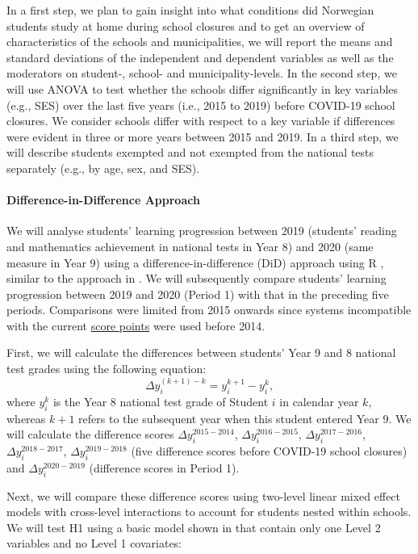 In a first step, we plan to gain insight into what conditions did Norwegian students study at home during school closures and to get an overview of characteristics of the schools and municipalities, we will report the means and standard deviations of the independent and dependent variables as well as the moderators on student-, school- and municipality-levels. In the second step, we will use ANOVA to test whether the schools differ significantly in key variables (e.g., SES) over the last five years (i.e., 2015 to 2019) before COVID-19 school closures. We consider schools differ with respect to a key variable if differences were evident in three or more years between 2015 and 2019. In a third step, we will describe students exempted and not exempted from the national tests separately (e.g., by age, sex, and SES).

\paragraph{Difference-in-Difference Approach}

We will analyse students' learning progression between 2019 (students' reading and mathematics achievement in national tests in Year 8) and 2020 (same measure in Year 9) using a difference-in-difference (DiD) approach \parencite{angrist:2009} using \textsf{R} \parencite[e.g., ][]{brumback:2021}, similar to the approach in \textcite{engzell:2021}. We will subsequently compare students' learning progression between 2019 and 2020 (Period 1) with that in the preceding five periods. Comparisons were limited from 2015 onwards since systems incompatible with the current \href{https://www.ssb.no/en/utdanning/grunnskoler/statistikk/nasjonale-prover}{score points} were used before 2014.

First, we will calculate the differences between students' Year 9 and 8 national test grades using the following equation:
    \[ \Delta y_i^{(k+1)-k} = y_i^{k+1} - y_i^k, \]
where $y_i^k$  is the Year 8 national test grade of Student $i$ in calendar year $k$, whereas $k+1$ refers to the subsequent year when this student entered Year 9. We will calculate the difference scores $\Delta y_i^{2015-2014}$,  $\Delta y_i^{2016-2015}$, $\Delta y_i^{2017-2016}$, $\Delta y_i^{2018-2017}$, $\Delta y_i^{2019-2018}$ (five difference scores before COVID-19 school closures) and $\Delta y_i^{2020-2019}$ (difference scores in Period 1).

Next, we will compare these difference scores using two-level linear mixed effect models with cross-level interactions to account for students nested within schools. We will test H1 using a basic model shown in  that contain only one Level 2 variables  and no Level 1 covariates:


